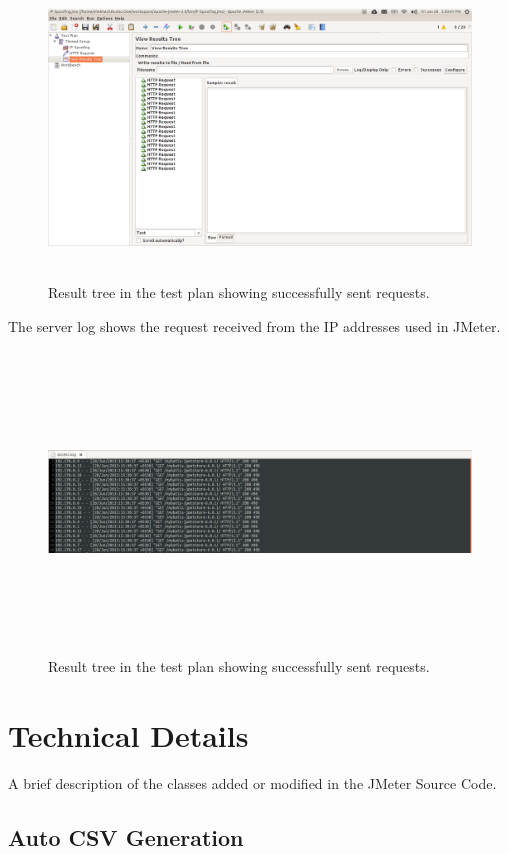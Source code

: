 \documentclass[12pt]{book}
\begin{document}
 \begin{figure}[H]
   \centering
   \includegraphics[width=15cm, height=8cm]{images/ip_85}
   \caption{Result tree in the test plan showing successfully sent requests.\label{fig:fig88_JMeter}}
  \end{figure}
  
  The server log shows the request received from the IP addresses used in JMeter.
   \begin{figure}[H]
   \centering
   \includegraphics[width=15cm, height=8cm]{images/ip_86}
   \caption{Result tree in the test plan showing successfully sent requests.\label{fig:fig89_JMeter}}
  \end{figure}
  
\chapter{Technical Details}
 A brief description of the classes added or modified in the JMeter Source Code.
 \section{Auto CSV Generation}\cite{CSV}
 
\end{document}

